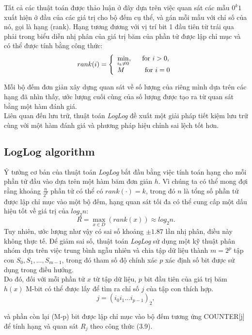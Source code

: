 \documentclass[letterpaper,13pt]{article}
\theoremstyle{mytheor}
\begin{document}
Tất cả các thuật toán được thảo luận ở đây dựa trên việc quan sát các mẫu $0^k1$ xuất hiện ở đầu của các giá trị cho bộ đếm cụ thể, và gán mỗi mẫu 
với chỉ số của nó, gọi là hạng (rank). Hạng tương đương với vị trí bit 1 đầu tiên từ trái qua phải trong biểu diễn nhị phân của giá trị băm của phần tử được lập chỉ mục 
và có thể được tính bằng công thức:
\[
    rank(i)=\left\{
                \begin{array}{ll}
                    \min\limits_{i_k\neq 0}, \indent\text{for } i > 0,\\
                    M\indent\indent\text{for } i = 0
                \end{array}
            \right.
\]

Mỗi bộ đếm đơn giản xây dựng quan sát về số lượng của riêng mình dựa trên các hạng đã nhìn thấy, ước lượng 
cuối cùng của số lượng được tạo ra từ quan sát bằng một hàm đánh giá.\\

Liên quan đến lưu trữ, thuật toán \textit{LogLog} đề xuất một giải pháp tiết kiệm lưu trữ cùng với một hàm đánh giá và phương pháp hiệu chỉnh sai lệch tốt hơn.
\subsection{LogLog algorithm}
Ý tưởng cơ bản của thuật toán \textit{LogLog} bắt đầu bằng việc tính toán hạng cho mỗi phần tử đầu vào dựa trên một hàm băm đơn giản $h$. Vì chúng ta 
có thể mong đợi rằng khoảng $\frac{n}{2^k}$ phần tử có thể có $rank(\cdot) = k$, trong đó $n$ là tổng số phần tử được lập chỉ mục vào một bộ đếm, 
hạng quan sát tối đa có thể cung cấp một dấu hiệu tốt về giá trị của $log_2n$:
\[R = \underset{x \in D}{\max}\left(rank(x)\right) \approx log_2n.\]
Tuy nhiên, ước lượng như vậy có sai số khoảng $\pm1.87$ lần nhị phân, điều này không thực tế. Để giảm sai số, thuật toán \textit{LogLog} sử dụng 
một kỹ thuật phân nhóm dựa trên việc trung bình ngẫu nhiên và chia tập dữ liệu thành $m = 2^p$ tập con $S_0, S_1,..., S_{m-1}$, trong đó tham số 
độ chính xác $p$ xác định số bit được sử dụng trong điều hướng.\\

Do đó, đối với mỗi phần tử $x$ từ tập dữ liệu, $p$ bit đầu tiên của giá trị băm $h(x)$ M-bit có thể được lấy để tìm ra chỉ số $j$ của tập con thích hợp.
\[j = \left(i_0i_1...i_{p-1}\right)_2,\]

và phần còn lại (M-p) bit được lập chỉ mục vào bộ đếm tương ứng COUNTER[j] để tính hạng và quan sát $R_j$ theo công thức (3.9).\\
\end{document}
